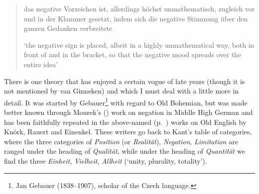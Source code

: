 \begin{quote}
das negative Vorzeichen ist, allerdings höchst unmathematisch, zugleich vor und in der Klammer gesetzt, indem sich die negative Stimmung über den ganzen Gedanken verbreitete %

`the negative sign is placed, albeit in a highly unmathematical way, both in front of and in the bracket, so that the negative mood spreads over the entire idea'
\end{quote}

\label{sec:kant}There is one theory that has enjoyed a certain vogue of late years (though it is not mentioned by van Ginneken) and which I must deal with a little more in detail. It was started by Gebauer\footnote{Jan Gebauer (1838–1907), scholar of the Czech language. \eds} with regard to Old Bohemian, but was made better known through Mourek's (\citeyear{mourek1902ueber}) work on negation in Middle High German %
and has been faithfully repeated in the above-named (p.~\pageref{ch:preface}) works on Old English by Knörk, Rauert and Einenkel. These writers go back to Kant's %
table of categories, where the three categories of \textit{Position} (or \textit{Realität}), \textit{Negation}, \textit{Limitation} are ranged under the heading of \textit{Qualität}, while under the heading of \textit{Quantität} we find the three \textit{Einheit}, \textit{Vielheit}, \textit{Allheit} (`unity, plurality, totality'). %
